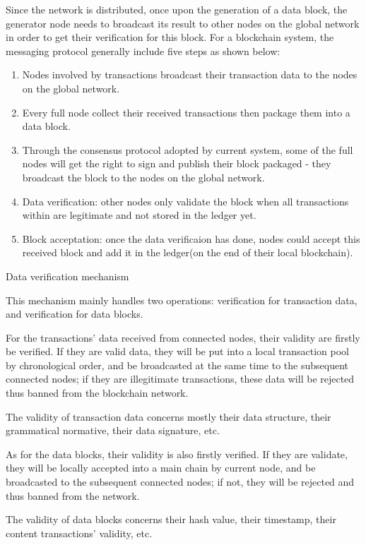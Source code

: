 \documentclass[doublespacing]{bmcart}
\begin{document}
\begin{CJK*}{UTF8}{gbsn}
\begin{description}
Since the network is distributed, once upon the generation of a data block, the generator node needs to broadcast its result to other nodes on the global network in order to get their verification for this block.
 For a blockchain system, the messaging protocol generally include five steps as shown below:
\begin{enumerate}[1)]
\item Nodes involved by transactions broadcast their transaction data to the nodes on the global network.
\item Every full node collect their received transactions then package them into a data block.
\item Through the consensus protocol adopted by current system, some of the full nodes will get the right to sign and publish their block packaged - they broadcast the block to the nodes on the global network.
\item Data verification: other nodes only validate the block when all transactions within are legitimate and not stored in the ledger yet.
\item Block acceptation: once the data verificaion has done, nodes could accept this received block and add it in the ledger(on the end of their local blockchain).
\end{enumerate}
 
\item[•] Data verification mechanism

	This mechanism mainly handles two operations: verification for transaction data, and verification for data blocks.
	
	For the transactions' data received from connected nodes, their validity are firstly be verified. If they are valid data, they will be put into a local transaction pool by chronological order, and be broadcasted at the same time to the subsequent connected nodes; if they are illegitimate transactions, these data will be rejected thus banned from the blockchain network.

	The validity of transaction data concerns mostly their data structure, their grammatical normative, their data signature, etc. 
	
	As for the data blocks, their validity is also firstly verified. If they are validate, they will be locally accepted into a main chain by current node, and be broadcasted to the subsequent connected nodes; if not, they will be rejected and thus banned from the network.

	The validity of data blocks concerns their hash value, their timestamp, their content transactions' validity, etc.
\end{description}


\end{CJK*}
\end{document}

